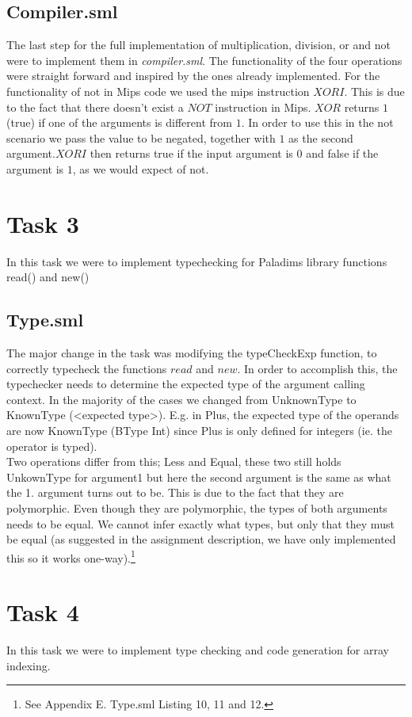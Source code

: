 \documentclass[12pt,a4paper,english]{article}
\begin{document}
\subsection{Compiler.sml}
The last step for the full implementation of multiplication, division, or and not were to implement them in \textit{compiler.sml}. The functionality of the four operations were straight forward and inspired by the ones already implemented. For the functionality of not in Mips code we used the mips instruction $XORI$. This is due to the fact that there doesn't exist a $NOT$ instruction in Mips. $XOR$ returns $1$ (true) if one of the arguments is different from $1$. In order to use this in the not scenario we pass the value to be negated, together with $1$ as the second argument.$XORI$ then returns true if the input argument is $0$ and false if the argument is $1$, as we would expect of not. 

\section{Task 3}
In this task we were to implement typechecking for Paladims library functions read() and new()

\subsection{Type.sml}
The major change in the task was modifying the typeCheckExp function, to correctly typecheck the functions $read$ and $new$. In order to accomplish this, the typechecker needs to determine the expected type of the argument calling context. In the majority of the cases we changed from UnknownType to KnownType (<expected type>). E.g. in Plus, the expected type of the operands are now KnownType (BType Int) since Plus is only defined for integers (ie. the operator is typed). \\

Two operations differ from this; Less and Equal, these two still holds UnkownType for argument1 but here the second argument is the same as what the 1. argument turns out to be. This is due to the fact that they are polymorphic. Even though they are polymorphic, the types of both arguments needs to be equal. We cannot infer exactly what types, but only that they must be equal (as suggested in the assignment description, we have only implemented this so it works one-way).\footnote{See Appendix E. Type.sml Listing 10, 11 and 12.}

\section{Task 4}
In this task we were to implement type checking and code generation for array indexing. 
\end{document}
